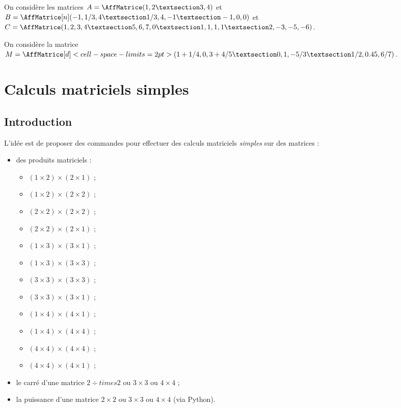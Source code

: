 \documentclass[french,a4paper,11pt]{article}
\begin{document}
\begin{PresentationCode}{}
On considère les matrices $A=\AffMatrice(1,2 § 3,4)$
et $B=\AffMatrice[n](-1,1/3,4 § 1/3,4,-1 § -1,0,0)$
et $C=\AffMatrice(1,2,3,4 § 5,6,7,0 § 1,1,1,1 § 2,-3,-5,-6)$.
\end{PresentationCode}

\begin{PresentationCode}{}
On considère la matrice
$M=\AffMatrice[d]<cell-space-limits=2pt>(1+1/4,0,3+4/5 § 0,1,-5/3 § 1/2,0.45,6/7)$.
\end{PresentationCode}

\pagebreak

\section{Calculs matriciels \og simples \fg}

\subsection{Introduction}

\begin{cautionblock}
L'idée est de proposer des commandes pour effectuer des calculs matriciels \textit{simples} sur des matrices :

\begin{itemize}
	\item des produits matriciels :
	\begin{itemize}[label=$\bullet$]
		\item $(1\times2)\times(2\times1)$ ;
		\item $(1\times2)\times(2\times2)$ ;
		\item $(2\times2)\times(2\times2)$ ;
		\item $(2\times2)\times(2\times1)$ ;
		\item $(1\times3)\times(3\times1)$ ;
		\item $(1\times3)\times(3\times3)$ ;
		\item $(3\times3)\times(3\times3)$ ;
		\item $(3\times3)\times(3\times1)$ ;
		\item $(1\times4)\times(4\times1)$ ;
		\item $(1\times4)\times(4\times4)$ ;
		\item $(4\times4)\times(4\times4)$ ;
		\item $(4\times4)\times(4\times1)$ ;
	\end{itemize}
	\item le carré d'une matrice $2÷times2$ ou $3\times3$ ou $4\times4$ ;
	\item la puissance d'une matrice $2\times2$ ou $3\times3$ ou $4\times4$ (via \textsf{Python}).
\end{itemize}
\vspace*{-\baselineskip}\leavevmode
\end{cautionblock}
\end{document}
